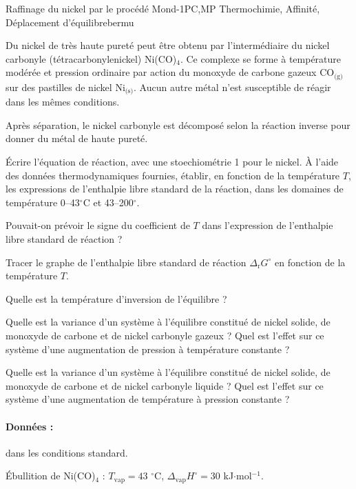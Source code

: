 \begin{exercise}{Raffinage du nickel par le procédé Mond}{-1}{PC,MP}
{Thermochimie, Affinité, Déplacement d'équilibre}{bermu}


    Du nickel de très haute pureté peut être obtenu par l’intermédiaire du nickel carbonyle (tétracarbonylenickel) Ni(CO)$_4$. Ce complexe se forme à température modérée et pression ordinaire par action du monoxyde de carbone gazeux CO$_\text{(g)}$ sur des pastilles de nickel Ni$_\text{(s)}$.
    Aucun autre métal n’est susceptible de réagir dans les mêmes conditions.
    
    Après séparation, le nickel carbonyle est décomposé selon la réaction inverse pour donner du métal de haute pureté.

\begin{questions}
    \question \'Ecrire l'équation de réaction, avec une stoechiométrie 1 pour le nickel.
    \question À l’aide des données thermodynamiques fournies, établir, en fonction de la température $T$, les expressions de l’enthalpie libre standard de la réaction, dans les domaines de température 0--43$^\circ$C et 43--200$^\circ$.
    
Pouvait-on prévoir le signe du coefficient de $T$ dans l’expression de l’enthalpie libre standard de réaction ?

    \question Tracer le graphe de l’enthalpie libre standard de réaction $\Delta_\text{r}G^\circ$ en fonction de la
température $T$.

Quelle est la température d’inversion de l’équilibre ?

    \question Quelle est la variance d’un système à l’équilibre constitué de nickel solide, de monoxyde de carbone et de nickel carbonyle gazeux ? Quel est l’effet sur ce système d’une augmentation de pression à température constante ?
    
    \question Quelle est la variance d’un système à l’équilibre constitué de nickel solide, de monoxyde de carbone et de nickel carbonyle liquide ? Quel est l’effet sur ce système d’une augmentation de température à pression constante ?

    \paragraph{Données :} dans les conditions standard.
    
    \'Ebullition de Ni(CO)$_4$ : $T_\text{vap} = 43$ $^\circ$C, $\Delta_\text{vap}H^\circ = 30$ kJ$\cdot$mol$^{-1}$.
    

\end{questions}
\end{exercise}

